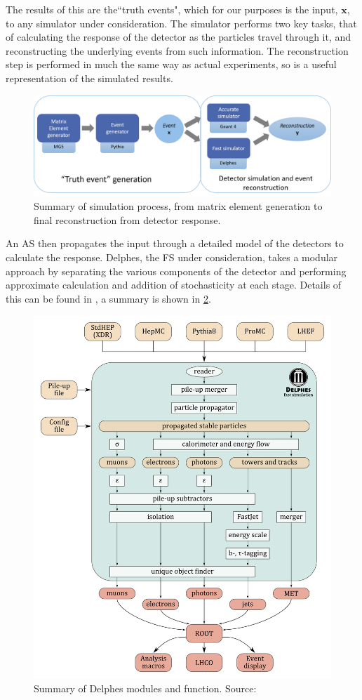 \documentclass{report}
\begin{document}
The results of this are the``truth events", which for our purposes is the input, $\mathbf{x}$, to any simulator under consideration. The simulator performs two key tasks, that of calculating the response of the detector as the particles travel through it, and reconstructing the underlying events from such information. The reconstruction step is performed in much the same way as actual experiments, so is a useful representation of the simulated results.        

\begin{figure}[H]
	\centering
	\includegraphics[width=0.8\linewidth]{simdiag}
	
	\caption{Summary of simulation process, from matrix element generation to final reconstruction from detector response.}
	\label{fig:simdiag}
	
\end{figure}	


An AS then propagates the input through a detailed model of the detectors to calculate the response. Delphes, the FS under consideration, takes a modular approach by separating the various components of the detector and performing approximate calculation and addition of stochasticity at each stage. Details of this can be found in \cite{delphes}, a summary is shown in \cref{fig:delphes}.  \\ 


\begin{figure}[H]
	\centering
	\includegraphics[width=0.7\linewidth]{delphes}
	
	\caption{Summary of Delphes modules and function. Source: \cite{delphesslid}}
	\label{fig:delphes}
	
\end{figure}
\end{document}
